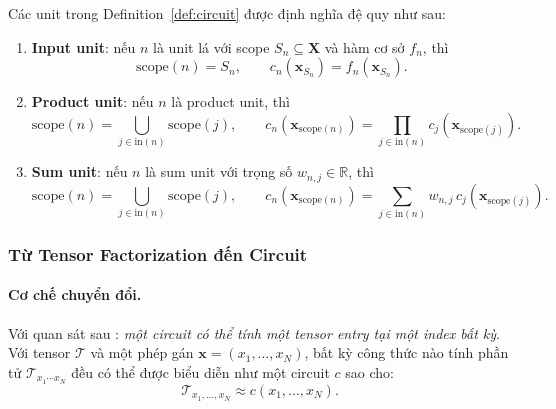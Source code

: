 \begin{definition}
\label{def:circuit-units}
Các unit trong Definition~\ref{def:circuit} được định nghĩa đệ quy như sau:
\begin{enumerate}[label=(\roman*), leftmargin=2em]
    \item \textbf{Input unit}: nếu $n$ là unit lá với scope
    $S_n\subseteq\mathbf{X}$ và hàm cơ sở $f_n$, thì
    \begin{equation}
        \mathrm{scope}(n)=S_n,\qquad
        c_n(\mathbf{x}_{S_n}) = f_n(\mathbf{x}_{S_n}).
        \label{eq:circuit-input-unit}
    \end{equation}

    \item \textbf{Product unit}: nếu $n$ là product unit, thì
    \begin{equation}
        \mathrm{scope}(n)
        =
        \bigcup_{j \in \mathrm{in}(n)} \mathrm{scope}(j),
        \qquad
        c_n(\mathbf{x}_{\mathrm{scope}(n)})
        =
        \prod_{j \in \mathrm{in}(n)}
        c_j(\mathbf{x}_{\mathrm{scope}(j)}).
        \label{eq:circuit-product-unit}
    \end{equation}

    \item \textbf{Sum unit}: nếu $n$ là sum unit với trọng số $w_{n,j}\in\mathbb{R}$,
    thì
    \begin{equation}
        \mathrm{scope}(n)
        =
        \bigcup_{j \in \mathrm{in}(n)} \mathrm{scope}(j),
        \qquad
        c_n(\mathbf{x}_{\mathrm{scope}(n)})
        =
        \sum_{j \in \mathrm{in}(n)}
        w_{n,j}\,
        c_j(\mathbf{x}_{\mathrm{scope}(j)}).
        \label{eq:circuit-sum-unit}
    \end{equation}
\end{enumerate}
\end{definition}
\subsubsection{Từ Tensor Factorization đến Circuit}

\paragraph{Cơ chế chuyển đổi.}
Với quan sát sau
\cite{chrysos2025foundationsTutorial}: \emph{một circuit có thể tính một tensor
entry tại một index bất kỳ}.  Với tensor $\mathcal{T}$ và một phép gán
$\mathbf{x} = (x_1, \ldots, x_N)$, bất kỳ công thức nào tính phần tử
$\mathcal{T}_{x_1 \cdots x_N}$ đều có thể được biểu diễn như một circuit $c$ sao
cho:
\begin{equation}
    \mathcal{T}_{x_1, \ldots, x_N} \approx c(x_1, \ldots, x_N).
\end{equation}


